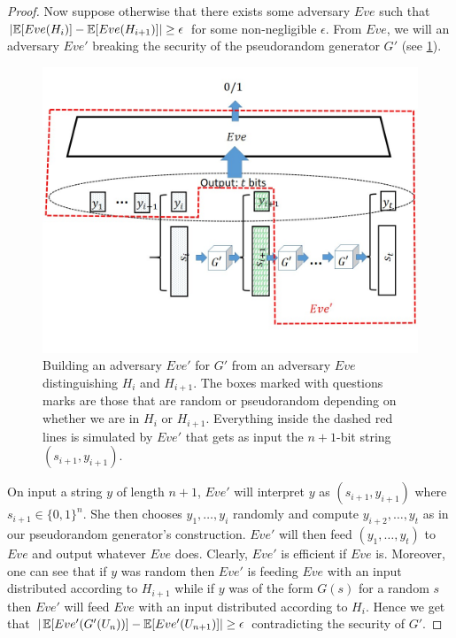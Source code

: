 \begin{proof}
Now suppose otherwise that there exists some adversary \(Eve\) such that
\(\left| \operatorname*{\mathbb E}[Eve(H_i)] - \operatorname*{\mathbb E}[Eve(H_{i+1})] \right| \geq \epsilon\) for
some non-negligible \(\epsilon\). From \(Eve\), we will an adversary
\(Eve'\) breaking the security of the pseudorandom generator \(G'\) (see
\cref{reductionlengthextendfig}).

\begin{figure}
\centering
\includegraphics[width=\textwidth, height=0.25\paperheight, keepaspectratio]{../figure/length-extension-prg-adversary.jpg}
\caption{Building an adversary \(Eve'\) for \(G'\) from an adversary
\(Eve\) distinguishing \(H_i\) and \(H_{i+1}\). The boxes marked with
questions marks are those that are random or pseudorandom depending on
whether we are in \(H_i\) or \(H_{i+1}\). Everything inside the dashed
red lines is simulated by \(Eve'\) that gets as input the \(n+1\)-bit
string \((s_{i+1},y_{i+1})\).}
\label{reductionlengthextendfig}
\end{figure}

On input a string \(y\) of length \(n+1\), \(Eve'\) will interpret \(y\)
as \((s_{i+1},y_{i+1})\) where \(s_{i+1} \in \{0,1\}^n\). She then
chooses \(y_1,\ldots,y_i\) randomly and compute \(y_{i+2},\ldots,y_t\)
as in our pseudorandom generator's construction. \(Eve'\) will then feed
\((y_1,\ldots,y_t)\) to \(Eve\) and output whatever \(Eve\) does.
Clearly, \(Eve'\) is efficient if \(Eve\) is. Moreover, one can see that
if \(y\) was random then \(Eve'\) is feeding \(Eve\) with an input
distributed according to \(H_{i+1}\) while if \(y\) was of the form
\(G(s)\) for a random \(s\) then \(Eve'\) will feed \(Eve\) with an
input distributed according to \(H_i\). Hence we get that
\(| \operatorname*{\mathbb E}[ Eve'(G'(U_n))] - \operatorname*{\mathbb E}[Eve'(U_{n+1})] | \geq \epsilon\)
contradicting the security of \(G'\).

\end{proof}

